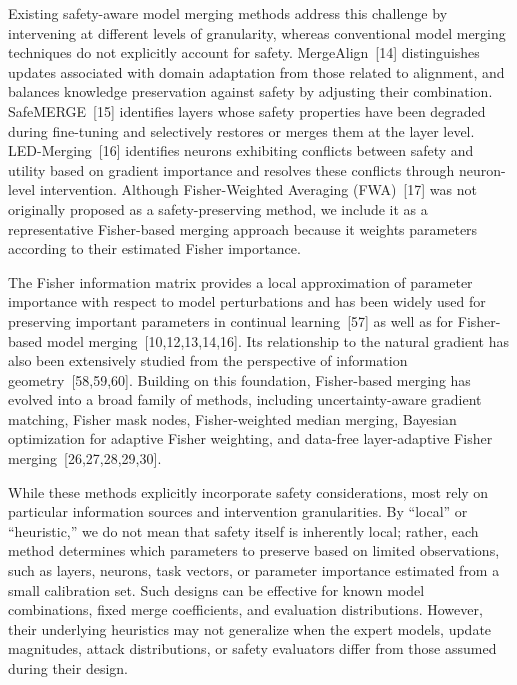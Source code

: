\documentclass{article}
\begin{document}
Existing safety-aware model merging methods address this challenge by intervening at different levels of granularity, whereas conventional model merging techniques do not explicitly account for safety. MergeAlign~[14] distinguishes updates associated with domain adaptation from those related to alignment, and balances knowledge preservation against safety by adjusting their combination. SafeMERGE~[15] identifies layers whose safety properties have been degraded during fine-tuning and selectively restores or merges them at the layer level. LED-Merging~[16] identifies neurons exhibiting conflicts between safety and utility based on gradient importance and resolves these conflicts through neuron-level intervention. Although Fisher-Weighted Averaging (FWA)~[17] was not originally proposed as a safety-preserving method, we include it as a representative Fisher-based merging approach because it weights parameters according to their estimated Fisher importance.

The Fisher information matrix provides a local approximation of parameter importance with respect to model perturbations and has been widely used for preserving important parameters in continual learning~[57] as well as for Fisher-based model merging~[10,12,13,14,16]. Its relationship to the natural gradient has also been extensively studied from the perspective of information geometry~[58,59,60]. Building on this foundation, Fisher-based merging has evolved into a broad family of methods, including uncertainty-aware gradient matching, Fisher mask nodes, Fisher-weighted median merging, Bayesian optimization for adaptive Fisher weighting, and data-free layer-adaptive Fisher merging~[26,27,28,29,30].

While these methods explicitly incorporate safety considerations, most rely on particular information sources and intervention granularities. By ``local'' or ``heuristic,'' we do not mean that safety itself is inherently local; rather, each method determines which parameters to preserve based on limited observations, such as layers, neurons, task vectors, or parameter importance estimated from a small calibration set. Such designs can be effective for known model combinations, fixed merge coefficients, and evaluation distributions. However, their underlying heuristics may not generalize when the expert models, update magnitudes, attack distributions, or safety evaluators differ from those assumed during their design.

\end{document}
